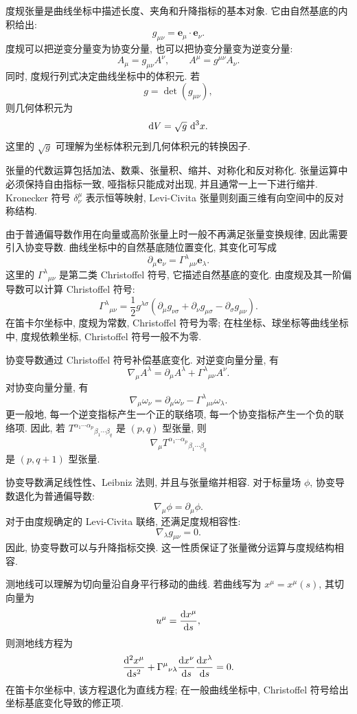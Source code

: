 度规张量是曲线坐标中描述长度、夹角和升降指标的基本对象. 它由自然基底的内积给出: 
\[
g_{\mu\nu}
=
\bm{e}_{\mu}\cdot\bm{e}_{\nu}.
\]
度规可以把逆变分量变为协变分量, 也可以把协变分量变为逆变分量: 
\[
A_{\mu}=g_{\mu\nu}A^{\nu},
\qquad
A^{\mu}=g^{\mu\nu}A_{\nu}.
\]
同时, 度规行列式决定曲线坐标中的体积元. 若
\[
g=\det(g_{\mu\nu}),
\]
则几何体积元为
\[
\mathop{}\!\mathrm{d} V=\sqrt{g}\,\mathop{}\!\mathrm{d}^{3}x.
\]
这里的 $\sqrt{g}$ 可理解为坐标体积元到几何体积元的转换因子. 

张量的代数运算包括加法、数乘、张量积、缩并、对称化和反对称化. 张量运算中必须保持自由指标一致, 哑指标只能成对出现, 并且通常一上一下进行缩并. Kronecker 符号 $\delta^{\mu}_{\nu}$ 表示恒等映射, Levi-Civita 张量则刻画三维有向空间中的反对称结构. 

由于普通偏导数作用在向量或高阶张量上时一般不再满足张量变换规律, 因此需要引入协变导数. 曲线坐标中的自然基底随位置变化, 其变化可写成
\[
\partial_{\mu}\bm{e}_{\nu}
=
\Gamma^{\lambda}{}_{\mu\nu}\bm{e}_{\lambda}.
\]
这里的 $\Gamma^{\lambda}{}_{\mu\nu}$ 是第二类 Christoffel 符号, 它描述自然基底的变化. 由度规及其一阶偏导数可以计算 Christoffel 符号: 
\[
\Gamma^{\lambda}{}_{\mu\nu}
=
\frac{1}{2}g^{\lambda\sigma}
\left(
\partial_{\mu}g_{\nu\sigma}
+
\partial_{\nu}g_{\mu\sigma}
-
\partial_{\sigma}g_{\mu\nu}
\right).
\]
在笛卡尔坐标中, 度规为常数, Christoffel 符号为零; 在柱坐标、球坐标等曲线坐标中, 度规依赖坐标, Christoffel 符号一般不为零. 

协变导数通过 Christoffel 符号补偿基底变化. 对逆变向量分量, 有
\[
\nabla_{\mu}A^{\lambda}
=
\partial_{\mu}A^{\lambda}
+
\Gamma^{\lambda}{}_{\mu\nu}A^{\nu}.
\]
对协变向量分量, 有
\[
\nabla_{\mu}\omega_{\nu}
=
\partial_{\mu}\omega_{\nu}
-
\Gamma^{\lambda}{}_{\mu\nu}\omega_{\lambda}.
\]
更一般地, 每一个逆变指标产生一个正的联络项, 每一个协变指标产生一个负的联络项. 因此, 若 $T^{\alpha_{1}\cdots\alpha_{p}}{}_{\beta_{1}\cdots\beta_{q}}$ 是 $(p,q)$ 型张量, 则
\[
\nabla_{\mu}T^{\alpha_{1}\cdots\alpha_{p}}{}_{\beta_{1}\cdots\beta_{q}}
\]
是 $(p,q+1)$ 型张量. 

协变导数满足线性性、Leibniz 法则, 并且与张量缩并相容. 对于标量场 $\phi$, 协变导数退化为普通偏导数: 
\[
\nabla_{\mu}\phi=\partial_{\mu}\phi.
\]
对于由度规确定的 Levi-Civita 联络, 还满足度规相容性: 
\[
\nabla_{\lambda}g_{\mu\nu}=0.
\]
因此, 协变导数可以与升降指标交换. 这一性质保证了张量微分运算与度规结构相容. 

测地线可以理解为切向量沿自身平行移动的曲线. 若曲线写为 $x^{\mu}=x^{\mu}(s)$, 其切向量为
\[
u^{\mu}=\frac{\mathop{}\!\mathrm{d} x^{\mu}}{\mathop{}\!\mathrm{d} s},
\]
则测地线方程为
\[
\frac{\mathop{}\!\mathrm{d}^{2}x^{\mu}}{\mathop{}\!\mathrm{d} s^{2}}
+
\Gamma^{\mu}{}_{\nu\lambda}
\frac{\mathop{}\!\mathrm{d} x^{\nu}}{\mathop{}\!\mathrm{d} s}
\frac{\mathop{}\!\mathrm{d} x^{\lambda}}{\mathop{}\!\mathrm{d} s}
=
0.
\]
在笛卡尔坐标中, 该方程退化为直线方程; 在一般曲线坐标中, Christoffel 符号给出坐标基底变化导致的修正项. 

